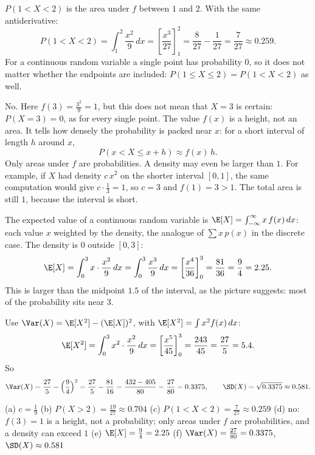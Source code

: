 \begin{solution}
	 $P(1<X<2)$ is the area under $f$ between $1$ and $2$. With the
	same antiderivative:
	\[
		P(1<X<2)=\int_1^2\frac{x^2}{9}\,dx=\left[\frac{x^3}{27}\right]_1^2
		=\frac{8}{27}-\frac{1}{27}=\frac{7}{27}\approx 0.259 .
	\]
	For a continuous random variable a single point has probability $0$, so it
	does not matter whether the endpoints are included:
	$P(1\le X\le 2)=P(1<X<2)$ as well.

	 No. Here $f(3)=\frac{3^2}{9}=1$, but this does not mean that
	$X=3$ is certain: $P(X=3)=0$, as for every single point. The value $f(x)$
	is a height, not an area. It tells how densely the probability is packed
	near $x$: for a short interval of length $h$ around $x$,
	\[
		P(x<X\le x+h)\approx f(x)\,h .
	\]
	Only areas under $f$ are probabilities. A density may even be larger than
	$1$. For example, if $X$ had density $c\,x^2$ on the shorter interval
	$[0,1]$, the same computation would give $c\cdot\frac13=1$, so $c=3$ and
	$f(1)=3>1$. The total area is still $1$, because the interval is short.

	 The expected value of a continuous random variable is
	$\E[X]=\int_{-\infty}^{\infty}x\,f(x)\,dx$: each value $x$ weighted by
	the density, the analogue of $\sum x\,p(x)$ in the discrete case. The
	density is $0$ outside $[0,3]$:
	\[
		\E[X]=\int_0^3 x\cdot\frac{x^2}{9}\,dx=\int_0^3\frac{x^3}{9}\,dx
		=\left[\frac{x^4}{36}\right]_0^3=\frac{81}{36}=\frac94=2.25 .
	\]
	This is larger than the midpoint $1.5$ of the interval, as the picture
	suggests: most of the probability sits near $3$.

	 Use $\Var(X)=\E[X^2]-(\E[X])^2$, with
	$\E[X^2]=\int x^2f(x)\,dx$:
	\[
		\E[X^2]=\int_0^3 x^2\cdot\frac{x^2}{9}\,dx=\left[\frac{x^5}{45}\right]_0^3
		=\frac{243}{45}=\frac{27}{5}=5.4 .
	\]
	So
	\[
		\Var(X)=\frac{27}{5}-\Bigl(\frac94\Bigr)^2=\frac{27}{5}-\frac{81}{16}
		=\frac{432-405}{80}=\frac{27}{80}=0.3375,
		\qquad
		\SD(X)=\sqrt{0.3375}\approx0.581 .
	\]

	\begin{answer}
		(a) $c=\frac19$ \quad
		(b) $P(X>2)=\frac{19}{27}\approx0.704$ \quad
		(c) $P(1<X<2)=\frac{7}{27}\approx0.259$ \quad
		(d) no: $f(3)=1$ is a height, not a probability; only areas under $f$
		are probabilities, and a density can exceed $1$ \quad
		(e) $\E[X]=\frac94=2.25$ \quad
		(f) $\Var(X)=\frac{27}{80}=0.3375$, $\SD(X)\approx0.581$
	\end{answer}
\end{solution}
